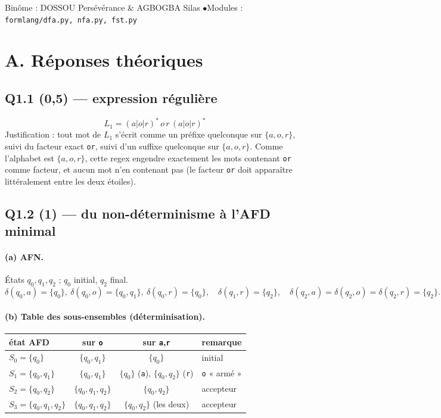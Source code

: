 \documentclass[11pt,a4paper]{scrartcl}
\begin{document}
{Binôme : DOSSOU Persévérance \& AGBOGBA Silas \quad$\bullet$\quad Modules : \texttt{formlang/dfa.py, nfa.py, fst.py}}

\section*{A. Réponses théoriques}

\subsection*{Q1.1 (0,5) — expression régulière}
$$L_1 = (a|o|r)^* \, o \, r \, (a|o|r)^*$$
\noindent Justification : tout mot de $L_1$ s'écrit comme un préfixe quelconque sur
$\{a,o,r\}$, suivi du facteur exact \texttt{or}, suivi d'un suffixe quelconque sur
$\{a,o,r\}$. Comme l'alphabet est $\{a,o,r\}$, cette regex engendre exactement les
mots contenant \texttt{or} comme facteur, et aucun mot n'en contenant pas (le facteur
\texttt{or} doit apparaître littéralement entre les deux étoiles).

\subsection*{Q1.2 (1) — du non-déterminisme à l'AFD minimal}

\paragraph{(a) AFN.} États $q_0,q_1,q_2$ ; $q_0$ initial, $q_2$ final.
$$\delta(q_0,a)=\{q_0\},\ \delta(q_0,o)=\{q_0,q_1\},\ \delta(q_0,r)=\{q_0\},\quad
\delta(q_1,r)=\{q_2\},\quad \delta(q_2,a)=\delta(q_2,o)=\delta(q_2,r)=\{q_2\}.$$

\paragraph{(b) Table des sous-ensembles (déterminisation).}
\begin{center}\small
\begin{tabular}{@{}lccl@{}}
\toprule
état AFD & sur \texttt{o} & sur \texttt{a},\texttt{r} & remarque\\\midrule
$S_0=\{q_0\}$ & $\{q_0,q_1\}$ & $\{q_0\}$ & initial\\
$S_1=\{q_0,q_1\}$ & $\{q_0,q_1\}$ & $\{q_0\}$ (\texttt a), $\{q_0,q_2\}$ (\texttt r) & \texttt o « armé »\\
$S_2=\{q_0,q_2\}$ & $\{q_0,q_1,q_2\}$ & $\{q_0,q_2\}$ & accepteur\\
$S_3=\{q_0,q_1,q_2\}$ & $\{q_0,q_1,q_2\}$ & $\{q_0,q_2\}$ (les deux) & accepteur\\
\bottomrule
\end{tabular}
\end{center}
\end{document}
